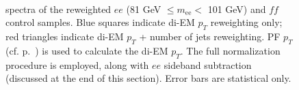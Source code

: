 \documentclass[dissertation_bw.tex]{subfiles}
\begin{document}
\begin{figure}
	\\
	\hspace{1cm}
	\caption{\MET spectra of the reweighted $ee$ (81 GeV $\leq m_{\mathrm{ee}} <$ 101 GeV) and $\mathit{ff}$ control samples.  Blue squares indicate di-EM $p_{T}$ reweighting only; red triangles indicate di-EM $p_{T}$ + number of jets reweighting.  PF $p_{T}$ (cf. p.~\pageref{fig:MET_vs_di-EM_pT}) is used to calculate the di-EM $p_{T}$.  The full normalization procedure is employed, along with $ee$ sideband subtraction (discussed at the end of this section).  Error bars are statistical only.}
	\label{fig:dijet_pT_and_Nj_vs_dijet_pT_reweighting}
\end{figure}
\end{document}
